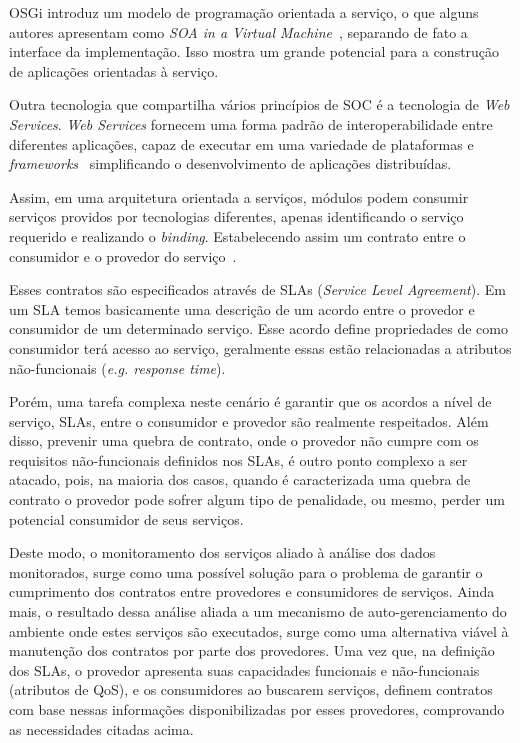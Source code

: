 OSGi introduz um modelo de programação orientada a serviço, o que alguns autores apresentam como \textit{SOA in a Virtual Machine}~\cite{hall2010osgi}, separando de fato a interface da implementação. Isso mostra um grande potencial para a construção de aplicações orientadas à serviço.

Outra tecnologia que compartilha vários princípios de SOC é a tecnologia de \textit{Web Services}. \textit{Web Services} fornecem uma forma padrão de interoperabilidade entre diferentes aplicações, capaz de executar em uma variedade de plataformas e \textit{frameworks}~\cite{w3c2002ws} simplificando o desenvolvimento de aplicações distribuídas.

Assim, em uma arquitetura orientada a serviços, módulos podem consumir serviços providos por tecnologias diferentes, apenas identificando o serviço requerido e realizando o \textit{binding}. Estabelecendo assim um contrato entre o consumidor e o provedor do serviço~\cite{oracle2005ws}.

Esses contratos são especificados através de SLAs (\textit{Service Level Agreement}). Em um SLA temos basicamente uma descrição de um acordo entre o provedor e consumidor de um determinado serviço. Esse acordo define propriedades de como consumidor terá acesso ao serviço, geralmente essas estão relacionadas a atributos não-funcionais (\textit{e.g. response time}).

Porém, uma tarefa complexa neste cenário é garantir que os acordos a nível de serviço, SLAs, entre o consumidor e provedor são realmente respeitados. Além disso, prevenir uma quebra de contrato, onde o provedor não cumpre com os requisitos não-funcionais definidos nos SLAs, é outro ponto complexo a ser atacado, pois, na maioria dos casos, quando é caracterizada uma quebra de contrato o provedor pode sofrer algum tipo de penalidade, ou mesmo, perder um potencial consumidor de seus serviços.

Deste modo, o monitoramento dos serviços aliado à análise dos dados monitorados, surge como uma possível solução para o problema de garantir o cumprimento dos contratos entre provedores e consumidores de serviços. Ainda mais, o resultado dessa análise aliada a um mecanismo de auto-gerenciamento do ambiente onde estes serviços são executados, surge como uma alternativa viável à manutenção dos contratos por parte dos provedores. Uma vez que, na definição dos SLAs, o provedor apresenta suas capacidades funcionais e não-funcionais (atributos de QoS), e os consumidores ao buscarem serviços, definem contratos com base nessas informações disponibilizadas por esses provedores, comprovando as necessidades citadas acima.

